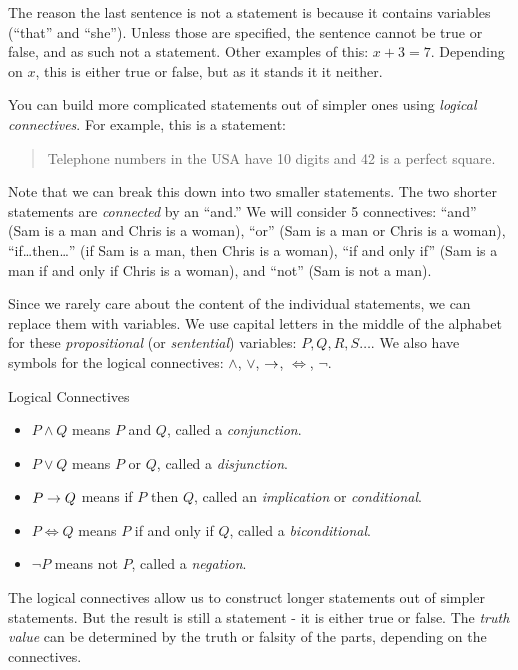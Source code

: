 \documentclass[12pt]{article}
\begin{document}
The reason the last sentence is not a statement is because it contains variables (``that'' and ``she'').  Unless those are specified, the sentence cannot be true or false, and as such not a statement.  Other examples of this: $x + 3 = 7$.  Depending on $x$, this is either true or false, but as it stands it it neither.

You can build more complicated statements out of simpler ones using {\em logical connectives}.  For example, this is a statement: 
\begin{quote}
Telephone numbers in the USA have 10 digits and 42 is a perfect square.
\end{quote}  
Note that we can break this down into two smaller statements.  The two shorter statements are {\em connected} by an ``and.''  We will consider 5 connectives: ``and'' (Sam is a man and Chris is a woman), ``or'' (Sam is a man or Chris is a woman), ``if\ldots then\ldots'' (if Sam is a man, then Chris is a woman), ``if and only if'' (Sam is a man if and only if Chris is a woman), and ``not'' (Sam is not a man).

Since we rarely care about the content of the individual statements, we can replace them with variables.  We use capital letters in the middle of the alphabet for these {\em propositional} (or {\em sentential}) variables: $P, Q, R, S\ldots$.  We also have symbols for the logical connectives: $\wedge$, $\vee$, $\rightarrow$, $\iff$, $\neg$.

\begin{defbox}{Logical Connectives}
\begin{itemize}
 \item $P \wedge Q$ means  $P$ and $Q$, called a {\em conjunction}.
\item $P \vee Q$ means $P$ or $Q$, called a {\em disjunction}.
\item $P \rightarrow Q$ means if $P$ then $Q$, called an {\em implication} or {\em conditional}.
\item $P \iff Q$ means $P$ if and only if $Q$, called a {\em biconditional}.
\item $\neg P$ means not $P$, called a {\em negation}.
\end{itemize}
\end{defbox}

The logical connectives allow us to construct longer statements out of simpler statements.  But the result is still a statement - it is either true or false.  The {\em truth value} can be determined by the truth or falsity of the parts, depending on the connectives.  
\end{document}
